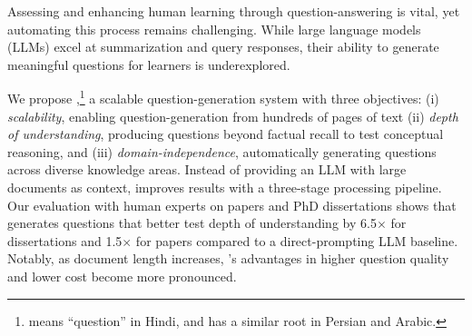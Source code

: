 Assessing and enhancing human learning through question-answering is vital, yet automating this process remains challenging. While large language models (LLMs) excel at summarization and query responses, their ability to generate meaningful questions for learners is underexplored. 


We propose \name,\footnote{\name means ``question'' in Hindi, and has a similar root in Persian and Arabic.} a scalable question-generation system with three objectives: (i) {\em scalability}, enabling question-generation from hundreds of pages of text (ii) {\em depth of understanding}, producing questions beyond factual recall to test conceptual reasoning, and (iii) {\em domain-independence}, automatically generating questions across diverse knowledge areas. Instead of providing an LLM with large documents as context, \name improves results with a three-stage processing pipeline. 
Our evaluation with \totalevaluators human experts on \totaldocuments papers and PhD dissertations shows that \name generates questions that better test depth of understanding by 6.5$\times$ for dissertations and 1.5$\times$ for papers compared to a direct-prompting LLM baseline. Notably, as document length increases, \name's advantages in higher question quality and lower cost become more pronounced.
